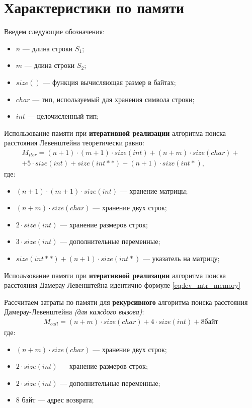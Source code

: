 \section{Характеристики по памяти}

Введем следующие обозначения:
\begin{itemize}
	\item$n$ --- длина строки $S_{1}$;
	\item$m$ --- длина строки $S_{2}$;
	\item$size()$ --- функция вычисляющая размер в байтах;
	\item $char$ --- тип, используемый для хранения символа строки;
	\item $int$ --- целочисленный тип;
\end{itemize}

Использование памяти при \textbf{итеративной реализации} алгоритма поиска расстояния Левенштейна теоретически равно:
\begin{equation}
	\label{eq:lev_mtr_memory}
	\begin{aligned}
		M_{iter} = (n + 1) \cdot (m + 1) \cdot size(int) + (n + m) \cdot size(char) + \\ + 5 \cdot size(int) + size(int **) + (n + 1) \cdot size(int *),
	\end{aligned}
\end{equation}
где: 
\begin{itemize}
	\item $(n + 1) \cdot (m + 1) \cdot size(int)$ --- хранение матрицы;
	\item $(n + m) \cdot size(char)$ --- хранение двух строк;
	\item $2 \cdot size(int)$ --- хранение размеров строк;
	\item $3 \cdot size(int)$ --- дополнительные переменные;
	\item $size(int**) + (n + 1) \cdot size(int *)$ --- указатель на матрицу;
\end{itemize}

Использование памяти при \textbf{итеративной реализации} алгоритма поиска расстояния Дамерау-Левенштейна идентично формуле \ref{eq:lev_mtr_memory}

Рассчитаем затраты по памяти для \textbf{рекурсивного} алгоритма поиска расстояния Дамерау-Левенштейна\textit{ (для каждого вызова)}:
\begin{equation}
	\label{}
	\begin{aligned}
		M_{call} = (n + m) \cdot size(char) + 4 \cdot size(int) + 8 байт
	\end{aligned}
\end{equation}
где: 
\begin{itemize}
	\item $(n + m) \cdot size(char)$ --- хранение двух строк;
	\item $2 \cdot size(int)$ --- хранение размеров строк;
	\item $2 \cdot size(int)$ --- дополнительные переменные;
	\item 8 байт --- адрес возврата;
\end{itemize}

